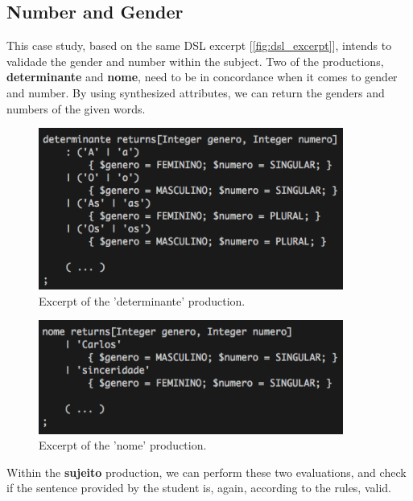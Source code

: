 \subsection{Number and Gender}
This case study, based on the same \textsc{DSL} excerpt [\ref{fig:dsl_excerpt}], intends to validade the gender and number within the subject. Two of the productions, \textbf{determinante} and \textbf{nome}, need to be in concordance when it comes to gender and number. By using synthesized attributes, we can return the genders and numbers of the given words.

\begin{figure}[h]
    \centering
    \includegraphics[width=10cm]{images/dsl_determinante_excerpt.png}
    \caption{Excerpt of the 'determinante' production.}
    \label{fig:determinante_dsl_excerpt}
\end{figure}

\begin{figure}[h]
    \centering
    \includegraphics[width=10cm]{images/dsl_nome_excerpt.png}
    \caption{Excerpt of the 'nome' production.}
    \label{fig:nome_dsl_excerpt}
\end{figure}

Within the \textbf{sujeito} production, we can perform these two evaluations, and check if the sentence provided by the student is, again, according to the rules, valid.

